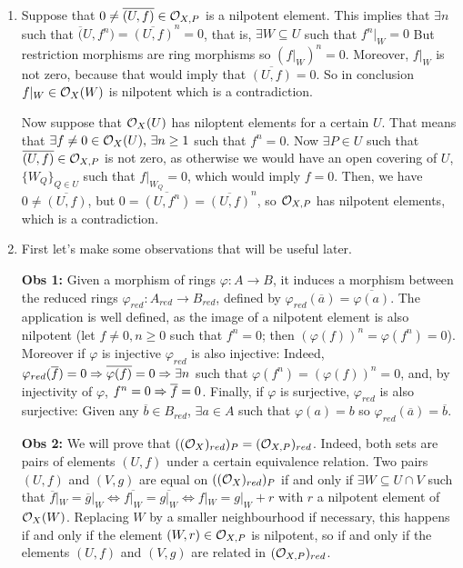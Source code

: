 \begin{sol}
	\begin{enumerate}[label=\alph*)]
		\item \boxed{\Rightarrow} Suppose that $0 \neq \overline{(U,f)} \in \mathcal{O}_{X,P}$ is a nilpotent element. This implies that $\exists n$ such that $\overline({U, f^n}) = \overline{(U,f)}^n = 0$, that is, $\exists W \subseteq U$ such that $f^n|_{W} = 0$ But restriction morphisms are ring morphisms so $(f|_{W})^n = 0$. Moreover, $f|_W$ is not zero, because that would imply that $\overline{(U,f)} = 0$. So in conclusion $f|_W \in \mathcal{O}_X(W)$ is nilpotent which is a contradiction.

		\boxed{\Leftarrow} Now suppose that $\mathcal{O}_X(U)$ has niloptent elements for a certain $U$. That means that $\exists f \neq 0 \in \mathcal{O}_X(U), \, \exists n \geq 1$ such that $f^n = 0$. Now $\exists P \in U$ such that $\overline{(U,f)} \in \mathcal{O}_{X,P}$ is not zero, as otherwise we would have an open covering of $U$, $\{W_Q\}_{Q \in U}$ such that $f|_{W_Q} = 0$, which would imply $f = 0$. Then, we have $0 \neq \overline{(U,f)}$, but $0 = \overline{(U, f^n)} = \overline{(U,f)}^n$, so $\mathcal{O}_{X,P}$ has nilpotent elements, which is a contradiction.

		\item First let's make some observations that will be useful later. 

		\textbf{Obs 1:} Given a morphism of rings $\varphi: A \to B$, it induces a morphism between the reduced rings $\varphi_{red}:A_{red} \to B_{red}$, defined by $\varphi_{red}(\overline{a}) = \overline{\varphi(a)}$. The application is well defined, as the image of a nilpotent element is also nilpotent (let $f \neq 0, n \geq 0$ such that $f^n = 0$; then $(\varphi(f))^n = \varphi(f^n) = 0$). Moreover if $\varphi$ is injective $\varphi_{red}$ is also injective: Indeed, $\varphi_{red}(\overline{f}) = 0 \Rightarrow \overline{\varphi(f)} = 0 \Rightarrow \exists n$ such that $\varphi(f^n) = (\varphi(f))^n = 0$, and, by injectivity of $\varphi$, $f^n = 0 \Rightarrow \overline{f} = 0$. Finally, if $\varphi$ is surjective, $\varphi_{red}$ is also surjective: Given any $\overline{b} \in B_{red}$, $\exists a \in A$ such that $\varphi(a) = b$ so $\varphi_{red}(\overline{a}) = \overline{b}$.

		\textbf{Obs 2:} We will prove that $((\mathcal{O}_{X})_{red})_P = (\mathcal{O}_{X,P})_{red}$. Indeed, both sets are pairs of elements $(U,f)$ under a certain equivalence relation. Two pairs $(U,f)$ and $(V,g)$ are equal on $((\mathcal{O}_{X})_{red})_P$ if and only if $\exists W \subseteq U \cap V$ such that $\overline{f}|_W = \overline{g}|_W \iff \overline{f|_W} = \overline{g|_W} \iff f|_W = g|_W + r$ with $r$ a nilpotent element of $\mathcal{O}_X(W)$. Replacing $W$ by a smaller neighbourhood if necessary, this happens if and only if the element $(W,r) \in \mathcal{O}_{X,P}$ is nilpotent, so if and only if the elements $(U,f)$ and $(V,g)$ are related in $(\mathcal{O}_{X,P})_{red}$.


\end{enumerate}
\end{sol}
